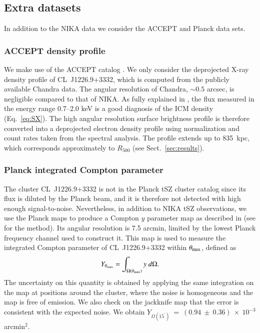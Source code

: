 \documentclass[twocolumn,traditabstract]{aa}
\begin{document}
\subsection{Extra datasets}\label{sec:extra_data}
In addition to the NIKA data we consider the ACCEPT and Planck data sets.
\subsubsection{ACCEPT density profile}\label{sec:accept}
We make use of the ACCEPT catalog \citep[Archive of Chandra Cluster Entropy Profile Tables\footnote{\url{http://www.pa.msu.edu/astro/MC2/accept/}},][]{cavagnolo2009}. We only consider the deprojected \mbox{X-ray} density profile of \mbox{CL~J1226.9+3332}, which is computed from the publicly available Chandra data. The angular resolution of Chandra, $\sim 0.5$ arcsec, is negligible compared to that of NIKA. As fully explained in \cite{cavagnolo2009}, the flux measured in the energy range 0.7--2.0 keV is a good diagnosis of the ICM density (Eq.~\ref{eq:SX}). The high angular resolution surface brightness profile is therefore converted into a deprojected electron density profile using normalization and count rates taken from the spectral analysis. The profile extends up to 835~kpc, which corresponds approximately to $R_{500}$ (see Sect.~\ref{sec:results}).

\subsubsection{Planck integrated Compton parameter}\label{sec:planck}
The cluster \mbox{CL~J1226.9+3332} is not in the Planck tSZ cluster catalog \citep{planck2013catalogue} since its flux is diluted by the Planck beam, and it is therefore not detected with high enough signal-to-noise. Nevertheless, in addition to NIKA tSZ observations, we use the Planck maps to produce a Compton $y$ parameter map as described in \cite{planck2013ymap} (see \cite{hurier2013} for the method). Its angular resolution is 7.5 arcmin, limited by the lowest Planck frequency channel used to construct it. This map is used to measure the integrated Compton parameter of \mbox{CL~J1226.9+3332} within $\theta_{\rm max}$, defined as
\begin{equation}
	Y_{\theta_{\rm max}} = \int_{\Omega(\theta_{\rm max})} y \ d\Omega.
\label{eq:Yint}
\end{equation}
The uncertainty on this quantity is obtained by applying the same integration on the map at positions around the cluster, where the noise is homogeneous and the map is free of emission. We also check on the jackknife \citep[half-ring half-difference, see][]{planck2013mission} map that the error is consistent with the expected noise. We obtain $Y_{\Omega(15^{'})}~=~\left(0.94~\pm~0.36\right)~\times~10^{-3}$ arcmin$^2$.
\end{document}
